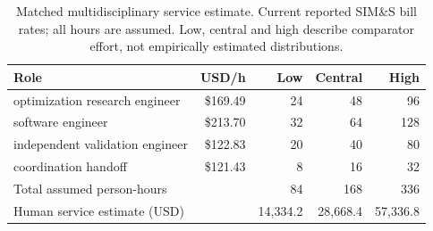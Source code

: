 \begin{table}[!htbp]\centering\small
\caption{Matched multidisciplinary service estimate. Current reported SIM\&S bill rates; all hours are assumed. Low, central and high describe comparator effort, not empirically estimated distributions.}
\begin{tabularx}{\linewidth}{Yrrrr}\toprule
Role & USD/h & Low & Central & High\\\midrule
optimization research engineer & \$169.49 & 24 & 48 & 96\\
software engineer & \$213.70 & 32 & 64 & 128\\
independent validation engineer & \$122.83 & 20 & 40 & 80\\
coordination handoff & \$121.43 & 8 & 16 & 32\\
Total assumed person-hours & \textemdash{} & 84 & 168 & 336\\
Human service estimate (USD) & \textemdash{} & 14,334.2 & 28,668.4 & 57,336.8\\
\bottomrule
\end{tabularx}
\par{}\par
\end{table}
